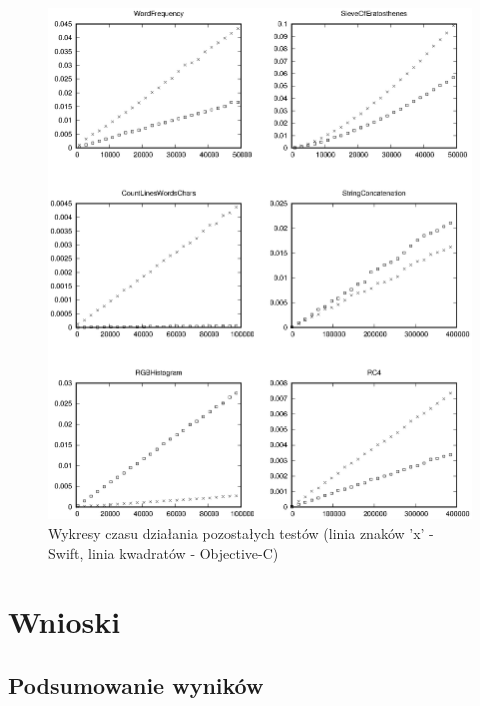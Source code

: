 \documentclass[mgr, shortabstract]{iithesis}
\begin{document}
\begin{figure}
    \includegraphics{plots/otherTests}
    \caption{Wykresy czasu działania pozostałych testów (linia znaków 'x' - Swift, linia kwadratów - Objective-C)}
    \label{p:other}
\end{figure}

\chapter{Wnioski}
\label{ch:wnioski}

\section{Podsumowanie wyników}
\end{document}
